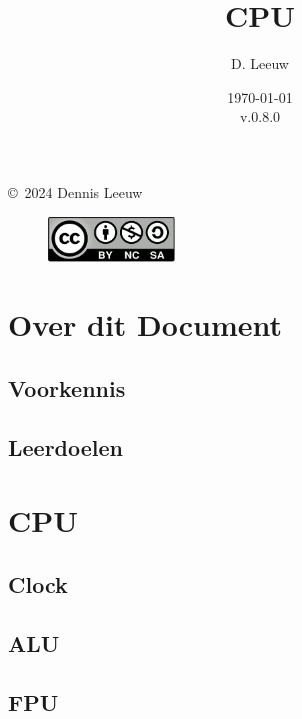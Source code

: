 \documentclass[a4paper,12pt,twoside,openright,titlepage]{book}
\author{D. Leeuw}
\title{CPU}
\date{\today\\v.0.8.0}
\begin{document}

\maketitle

\copyright\ 2024 Dennis Leeuw\\

\begin{figure}
\includegraphics[width=0.3\textwidth]{CC-BY-SA-NC.png}
\end{figure}

\bigskip




\frontmatter
\chapter{Over dit Document}
\section{Voorkennis}

\section{Leerdoelen}


\tableofcontents


\mainmatter
\chapter{CPU}

\section{Clock}

\section{ALU}

\section{FPU}

\end{document}

